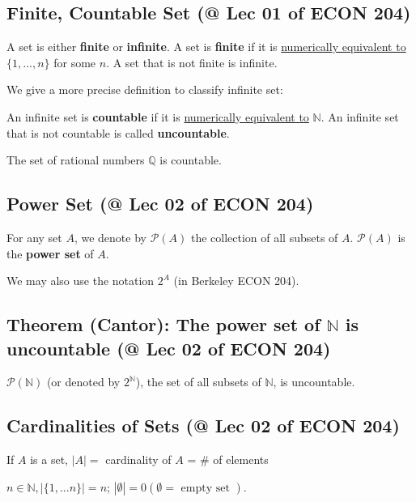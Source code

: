 \documentclass[11pt]{elegantbook}
\begin{document}
\subsection{Finite, Countable Set \small{(@ Lec 01 of ECON 204)}}
\begin{definition}
\normalfont
    A set is either \textbf{finite} or \textbf{infinite}. A set is \textbf{finite} if it is \underline{numerically equivalent to} $\{1,...,n\}$ for some $n$. A set that is not finite is infinite.
\end{definition}

We give a more precise definition to classify infinite set:
\begin{definition}
\normalfont
    An infinite set is \textbf{countable} if it is \underline{numerically equivalent to} $\mathbb{N}$. An infinite set that is not countable is called \textbf{uncountable}.
\end{definition}

\begin{theorem}
    The set of rational numbers $\mathbb{Q}$ is countable.
\end{theorem}


\subsection{Power Set \small{(@ Lec 02 of ECON 204)}}
\begin{definition}
    For any set $A$, we denote by $\mathcal{P}(A)$ the collection of all subsets of $A$. $\mathcal{P}(A)$ is the \textbf{power set} of $A$.
\end{definition}
We may also use the notation $2^A$ (in Berkeley ECON 204).

\subsection{Theorem (Cantor): The power set of $\mathbb{N}$ is uncountable \small{(@ Lec 02 of ECON 204)}}
\begin{theorem}[Cantor]
    $\mathcal{P}(\mathbb{N})$ (or denoted by $2^\mathbb{N}$), the set of all subsets of $\mathbb{N}$, is uncountable.
\end{theorem}

\subsection{Cardinalities of Sets \small{(@ Lec 02 of ECON 204)}}
\begin{definition}[Cardinality]
    If $A$ is a set, $|A|=$ cardinality of $A$ = $\#$ of elements
\end{definition}
$n \in \mathbb{N},|\{1, \ldots n\}|=n$; $|\emptyset|=0(\emptyset=\text { empty set })$.
\end{document}
